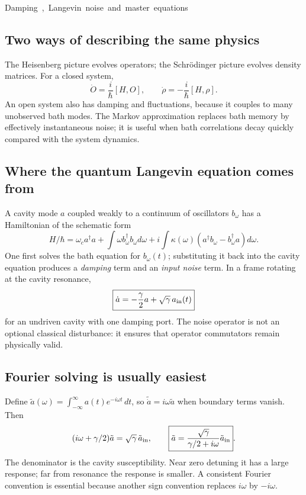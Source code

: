 \unit{Damping, Langevin noise and master equations}
\subsection{Two ways of describing the same physics}
The Heisenberg picture evolves operators;
the Schr\"odinger picture evolves density matrices.
For a closed system,
\[
\dot O=\frac{i}{\hbar}[H,O],\qquad
\dot\rho=-\frac{i}{\hbar}[H,\rho].
\]
An open system also has damping and fluctuations,
because it couples to many unobserved bath modes.
The Markov approximation replaces bath memory
by effectively instantaneous noise; it is
useful when bath correlations decay quickly
compared with the system dynamics.

\subsection{Where the quantum Langevin equation comes from}
A cavity mode \(a\) coupled weakly to
a continuum of oscillators \(b_\omega\)
has a Hamiltonian of the schematic form
\[
H/\hbar=\omega_ca^\dagger a+
\int\omega b_\omega^\dagger b_\omega d\omega+
i\int\kappa(\omega)
(a^\dagger b_\omega-b_\omega^\dagger a)d\omega.
\]
One first solves the bath equation for \(b_\omega(t)\);
substituting it back into the cavity equation
produces a \emph{damping} term and an
\emph{input noise} term. In a frame rotating
at the cavity resonance,
\[
\boxed{\dot a=-\frac\gamma2a+
\sqrt\gamma\,a_{\rm in}(t)}
\]
for an undriven cavity with one damping port.
The noise operator is not an optional
classical disturbance: it ensures that
operator commutators remain physically valid.

\subsection{Fourier solving is usually easiest}
Define
\(\tilde a(\omega)=\int_{-\infty}^\infty
a(t)e^{-i\omega t}\,dt\), so
\(\widetilde{\dot a}=i\omega\tilde a\)
when boundary terms vanish.
Then
\[
(i\omega+\gamma/2)\tilde a
=\sqrt\gamma\,\tilde a_{\rm in},
\qquad
\boxed{\tilde a=
\frac{\sqrt\gamma}{\gamma/2+i\omega}
\tilde a_{\rm in}}.
\]
The denominator is the cavity susceptibility.
Near zero detuning it has a large response;
far from resonance the response is smaller.
A consistent Fourier convention is essential
because another sign convention replaces
\(i\omega\) by \(-i\omega\).

